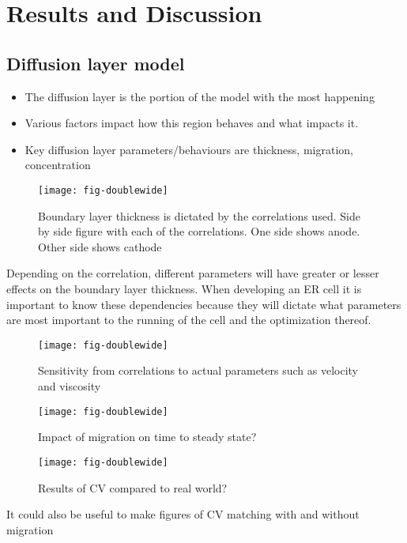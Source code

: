 \documentclass[journal=mamobx]{achemso}
\begin{document}

\section{Results and Discussion}
\subsection{Diffusion layer model}
\begin{itemize}
  \item The diffusion layer is the portion of the model with the most happening
  \item Various factors impact how this region behaves and what impacts it.
  \item Key diffusion layer parameters/behaviours are thickness, migration, concentration 
\end{itemize}
\begin{figure*}[htbp!]
  \texttt{[image: fig-doublewide]}
  \caption{Boundary layer thickness is dictated by the correlations used. Side by side figure with each of the correlations. One side shows anode. Other side shows cathode }
  \label{fig-doublewide}
\end{figure*}
Depending on the correlation, different parameters will have greater or lesser effects on the boundary layer thickness. 
When developing an ER cell it is important to know these dependencies because they will dictate what parameters are most important to the running of the cell and the optimization thereof.

\begin{figure*}[htbp!]
  \texttt{[image: fig-doublewide]}
  \caption{Sensitivity from correlations to actual parameters such as velocity and viscosity}
  \label{fig-doublewide}
\end{figure*}
\begin{figure*}[htbp!]
  \texttt{[image: fig-doublewide]}
  \caption{Impact of migration on time to steady state?}
  \label{fig-doublewide}
\end{figure*}
\begin{figure*}[htbp!]
  \texttt{[image: fig-doublewide]}
  \caption{Results of CV compared to real world?}
  \label{fig-doublewide}
\end{figure*}
It could also be useful to make figures of CV matching with and without migration 
\end{document}
